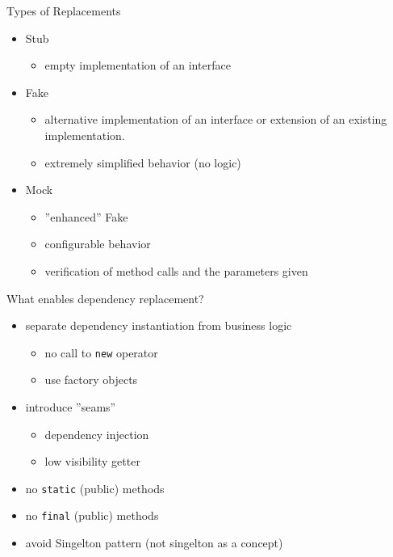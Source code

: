 \documentclass[SoftwareQuality.tex]{subfiles}
\begin{document}
\begin{frame}{Types of Replacements} 
	\begin{itemize}
	\item Stub
		\begin{itemize}
			\item empty implementation of an interface 
		\end{itemize}
		\vfill
	\item Fake
		\begin{itemize}
			\item alternative implementation of an interface or extension of an existing implementation.
			\item extremely simplified behavior (no logic)
		\end{itemize}
	\item Mock
		\begin{itemize}
			\item ''enhanced'' Fake
			\item configurable behavior
			\item verification of method calls and the parameters given
		\end{itemize}
	\end{itemize}
\end{frame}

\begin{frame}{What enables dependency replacement?} 
	\begin{itemize}
		\item separate dependency instantiation from business logic
			\begin{itemize}
				\item no call to \texttt{new} operator
				\item use factory objects
			\end{itemize}
		\item introduce ''seams''
			\begin{itemize}
				\item dependency injection
				\item low visibility getter
			\end{itemize}
		\item no \texttt{static} (public) methods
		\item no \texttt{final} (public) methods
		\item avoid Singelton pattern (not singelton as a concept)
	\end{itemize}
\end{frame}
\end{document}
